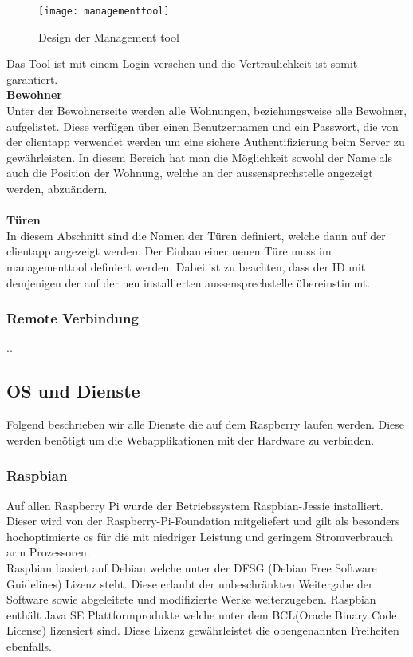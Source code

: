\begin{figure}[htb!]
	\begin{center}
		\texttt{[image: managementtool]}
		\caption[Design der Management tool]{Design der Management tool}
		\label{fig:managementtool}
	\end{center}
\end{figure}

Das Tool ist mit einem Login versehen und die Vertraulichkeit ist somit garantiert.
\\
\newline
\textbf{Bewohner} 
\\
Unter der Bewohnerseite werden alle Wohnungen, beziehungsweise alle Bewohner, aufgelistet. Diese verfügen über einen Benutzernamen und ein Passwort, die von der \gls{clientapp} verwendet werden um eine sichere Authentifizierung beim Server zu gewährleisten. In diesem Bereich hat man die Möglichkeit sowohl der Name als auch die Position der Wohnung, welche an der \gls{aussensprechstelle} angezeigt werden, abzuändern.
\\
\\
\textbf{Türen} 
\\
In diesem Abschnitt sind die Namen der Türen definiert, welche dann auf der \gls{clientapp} angezeigt werden. Der Einbau einer neuen Türe muss im \gls{managementtool} definiert werden. Dabei ist zu beachten, dass der ID mit demjenigen der auf der neu installierten \gls{aussensprechstelle} übereinstimmt. 
\\

\subsubsection{Remote Verbindung}
\label{kap:remote}
..


\subsection{OS und Dienste}
\label{kap:dienste}
Folgend beschrieben wir alle Dienste die auf dem Raspberry laufen werden. Diese werden benötigt um die Webapplikationen mit der Hardware zu verbinden.

\subsubsection{Raspbian}
\label{kap:raspbian}
Auf allen Raspberry Pi wurde der Betriebssystem Raspbian-Jessie installiert. Dieser wird von der Raspberry-Pi-Foundation mitgeliefert und gilt als besonders hochoptimierte \gls{os} für die mit niedriger Leistung und geringem Stromverbrauch \gls{arm} Prozessoren.
\\
 Raspbian basiert auf Debian welche unter der DFSG (Debian Free Software Guidelines) Lizenz steht. Diese erlaubt der unbeschränkten Weitergabe der Software sowie abgeleitete und modifizierte Werke weiterzugeben. Raspbian enthält Java SE Plattformprodukte welche unter dem BCL(Oracle Binary Code License) lizensiert sind. Diese Lizenz gewährleistet die obengenannten Freiheiten ebenfalls.
 \\

